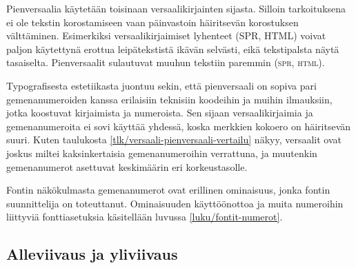 Pienversaalia käytetään toisinaan versaalikirjainten sijasta. Silloin
tarkoituksena ei ole tekstin korostamiseen vaan päinvastoin häiritsevän
korostuksen välttäminen. Esimerkiksi versaalikirjaimiset lyhenteet (SPR,
HTML) voivat paljon käytettynä erottua leipätekstistä ikävän selvästi,
eikä tekstipalsta näytä tasaiselta. Pienversaalit sulautuvat muuhun
tekstiin paremmin (\textsc{spr}, \textsc{html}).

Typografisesta estetiikasta juontuu sekin, että pienversaali on sopiva
pari gemenanumeroiden kanssa erilaisiin teknisiin koodeihin ja muihin
ilmauksiin, jotka koostuvat kirjaimista ja numeroista. Sen sijaan
versaalikirjaimia ja gemenanumeroita ei sovi käyttää yhdessä, koska
merkkien kokoero on häiritsevän suuri. Kuten taulukosta
\ref{tlk/versaali-pienversaali-vertailu} näkyy, versaalit ovat joskus
miltei kaksinkertaisia gemenanumeroihin verrattuna, ja muutenkin
gemenanumerot asettuvat keskimäärin eri korkeustasolle.


Fontin näkökulmasta gemenanumerot ovat erillinen ominaisuus, jonka
fontin suunnittelija on toteuttanut. Ominaisuuden käyttöönottoa ja muita
numeroihin liittyviä fonttiasetuksia käsitellään luvussa
\ref{luku/fontit-numerot}.

\subsection{Alleviivaus ja yliviivaus}

